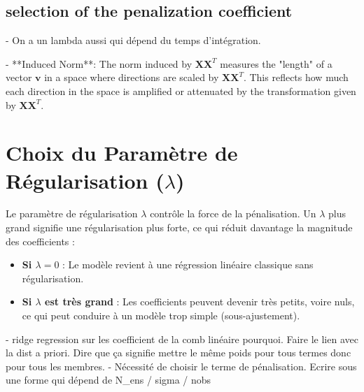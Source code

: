 \subsection{selection of the penalization coefficient}
- On a un lambda aussi qui dépend du temps d'intégration.


- **Induced Norm**: The norm induced by \(\mathbf{X}\mathbf{X}^T\) measures the "length" of a vector \(\mathbf{v}\) in a space where directions are scaled by \(\mathbf{X}\mathbf{X}^T\). This reflects how much each direction in the space is amplified or attenuated by the transformation given by \(\mathbf{X}\mathbf{X}^T\).

\section*{Choix du Paramètre de Régularisation (\(\lambda\))}

Le paramètre de régularisation \(\lambda\) contrôle la force de la pénalisation. Un \(\lambda\) plus grand signifie une régularisation plus forte, ce qui réduit davantage la magnitude des coefficients :
\begin{itemize}
    \item \textbf{Si \(\lambda = 0\)} : Le modèle revient à une régression linéaire classique sans régularisation.
    \item \textbf{Si \(\lambda\) est très grand} : Les coefficients peuvent devenir très petits, voire nuls, ce qui peut conduire à un modèle trop simple (sous-ajustement).
\end{itemize}


- ridge regression sur les coefficient de la comb linéaire pourquoi. Faire le lien avec la dist a priori. Dire que ça signifie mettre le même poids pour tous termes donc pour tous les membres.
- Nécessité de choisir le terme de pénalisation. Ecrire sous une forme qui dépend de N_ens / sigma / nobs